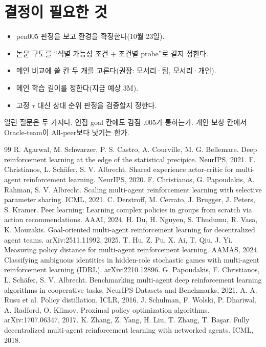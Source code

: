 \documentclass[11pt]{article}
\begin{document}
\section{결정이 필요한 것}
\begin{itemize}
  \item pen005 판정을 보고 환경을 확정한다(10월 23일).
  \item 논문 구도를 ``식별 가능성 조건 + 조건별 probe''로 갈지 정한다.
  \item 메인 비교에 쓸 칸 두 개를 고른다(권장: 모서리·팀, 모서리·개인).
  \item 메인 학습 길이를 정한다(지금 예상 3M).
  \item 고정 $\tau$ 대신 상대 순위 판정을 검증할지 정한다.
\end{itemize}
열린 질문은 두 가지다. 인접 goal 칸에도 감점 .005가 통하는가. 개인 보상 칸에서 Oracle-team이 All-peer보다 낫기는 한가.

\begin{thebibliography}{99}
 R. Agarwal, M. Schwarzer, P. S. Castro, A. Courville, M. G. Bellemare. Deep reinforcement learning at the edge of the statistical precipice. NeurIPS, 2021.
 F. Christianos, L. Sch\"afer, S. V. Albrecht. Shared experience actor-critic for multi-agent reinforcement learning. NeurIPS, 2020.
 F. Christianos, G. Papoudakis, A. Rahman, S. V. Albrecht. Scaling multi-agent reinforcement learning with selective parameter sharing. ICML, 2021.
 C. Derstroff, M. Cerrato, J. Brugger, J. Peters, S. Kramer. Peer learning: Learning complex policies in groups from scratch via action recommendations. AAAI, 2024.
 H. Du, H. Nguyen, S. Thudumu, R. Vasa, K. Mouzakis. Goal-oriented multi-agent reinforcement learning for decentralized agent teams. arXiv:2511.11992, 2025.
 T. Hu, Z. Pu, X. Ai, T. Qiu, J. Yi. Measuring policy distance for multi-agent reinforcement learning. AAMAS, 2024.
 Classifying ambiguous identities in hidden-role stochastic games with multi-agent reinforcement learning (IDRL). arXiv:2210.12896.
 G. Papoudakis, F. Christianos, L. Sch\"afer, S. V. Albrecht. Benchmarking multi-agent deep reinforcement learning algorithms in cooperative tasks. NeurIPS Datasets and Benchmarks, 2021.
 A. A. Rusu et al. Policy distillation. ICLR, 2016.
 J. Schulman, F. Wolski, P. Dhariwal, A. Radford, O. Klimov. Proximal policy optimization algorithms. arXiv:1707.06347, 2017.
 K. Zhang, Z. Yang, H. Liu, T. Zhang, T. Ba\c{s}ar. Fully decentralized multi-agent reinforcement learning with networked agents. ICML, 2018.
\end{thebibliography}
\end{document}
